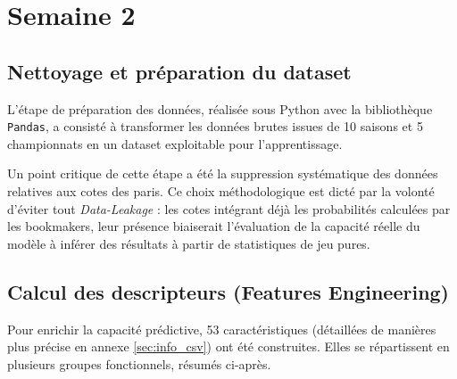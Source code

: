 


\chapter{Semaine 2}
\section{Nettoyage et préparation du dataset}
L'étape de préparation des données, réalisée sous Python avec la bibliothèque 
\texttt{Pandas}, a consisté à transformer les données brutes issues de 10 saisons 
et 5 championnats en un dataset exploitable pour l'apprentissage. 

Un point critique de cette étape a été la suppression systématique des données 
relatives aux cotes des paris. Ce choix méthodologique est dicté par la volonté 
d'éviter tout \textit{Data-Leakage} : les cotes intégrant déjà les probabilités 
calculées par les bookmakers, leur présence biaiserait l'évaluation de la capacité 
réelle du modèle à inférer des résultats à partir de statistiques de jeu pures.


\section{Calcul des descripteurs (Features Engineering)}
Pour enrichir la capacité prédictive, 53 caractéristiques (détaillées 
de manières plus précise en annexe \ref{sec:info_csv}) ont été construites. Elles se répartissent 
en plusieurs groupes fonctionnels, résumés ci-après.

